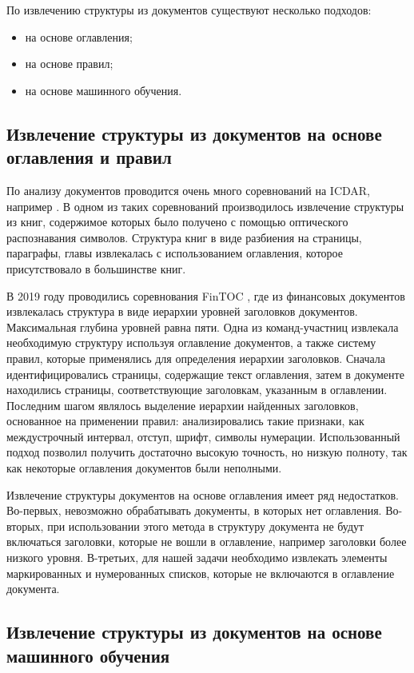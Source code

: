 \documentclass[a4paper,12pt]{article}
\begin{document}
По извлечению структуры из документов существуют несколько подходов:
\begin{itemize}
\item на основе оглавления;
\item на основе правил;
\item на основе машинного обучения.
\end{itemize}

\subsection{Извлечение структуры из документов на основе оглавления и правил}

По анализу документов проводится очень много соревнований на ICDAR, например \cite{link1,link2,link3}. В одном из таких соревнований \cite{link1} производилось извлечение структуры из книг, содержимое которых было получено с помощью оптического распознавания символов. Структура книг в виде разбиения на страницы, параграфы, главы извлекалась с использованием оглавления, которое присутствовало в большинстве книг. 

В 2019 году проводились соревнования FinTOC \cite{link4}, где из финансовых документов извлекалась структура в виде иерархии уровней заголовков документов. Максимальная глубина уровней равна пяти. Одна из команд-участниц \cite{link5} извлекала необходимую структуру используя оглавление документов, а также систему правил, которые применялись для определения иерархии заголовков.
Сначала идентифицировались страницы, содержащие текст оглавления, затем в документе находились страницы, соответствующие заголовкам, указанным в оглавлении. 
Последним шагом являлось выделение иерархии найденных заголовков, основанное на применении правил: анализировались такие признаки, как междустрочный интервал, отступ, шрифт, символы нумерации.
Использованный подход позволил получить достаточно высокую точность, но низкую полноту, так как некоторые оглавления документов были неполными.

Извлечение структуры документов на основе оглавления имеет ряд недостатков. Во-первых, невозможно обрабатывать документы, в которых нет оглавления. Во-вторых, при использовании этого метода в структуру документа не будут включаться заголовки, которые не вошли в оглавление, например заголовки более низкого уровня. В-третьих, для нашей задачи необходимо извлекать элементы маркированных и нумерованных списков, которые не включаются в оглавление документа.

\subsection{Извлечение структуры из документов на основе машинного обучения}
\end{document}
